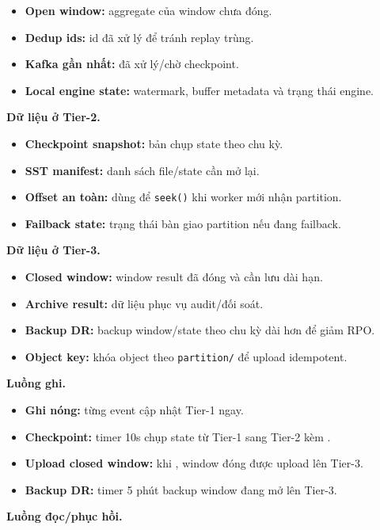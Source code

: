 \documentclass[12pt,a4paper]{article}
\begin{document}
\begin{itemize}
\item \textbf{Open window:} aggregate của window chưa đóng.
\item \textbf{Dedup ids:} id đã xử lý để tránh replay trùng.
\item \textbf{Kafka  gần nhất:}  đã xử lý/chờ checkpoint.
\item \textbf{Local engine state:} watermark, buffer metadata và trạng thái engine.
\end{itemize}
\textbf{Dữ liệu ở Tier-2.}

\begin{itemize}
\item \textbf{Checkpoint snapshot:} bản chụp state theo chu kỳ.
\item \textbf{SST manifest:} danh sách file/state cần mở lại.
\item \textbf{Offset an toàn:}  dùng để \texttt{seek(}\texttt{)} khi worker mới nhận partition.
\item \textbf{Failback state:} trạng thái bàn giao partition nếu đang failback.
\end{itemize}
\textbf{Dữ liệu ở Tier-3.}

\begin{itemize}
\item \textbf{Closed window:} window result đã đóng và cần lưu dài hạn.
\item \textbf{Archive result:} dữ liệu phục vụ audit/đối soát.
\item \textbf{Backup DR:} backup window/state theo chu kỳ dài hơn để giảm RPO.
\item \textbf{Object key:} khóa object theo \texttt{partition/} để upload idempotent.
\end{itemize}
\textbf{Luồng ghi.}

\begin{itemize}
\item \textbf{Ghi nóng:} từng event cập nhật Tier-1 ngay.
\item \textbf{Checkpoint:} timer 10s chụp state từ Tier-1 sang Tier-2 kèm .
\item \textbf{Upload closed window:} khi , window đóng được upload lên Tier-3.
\item \textbf{Backup DR:} timer 5 phút backup window đang mở lên Tier-3.
\end{itemize}
\textbf{Luồng đọc/phục hồi.}
\end{document}
